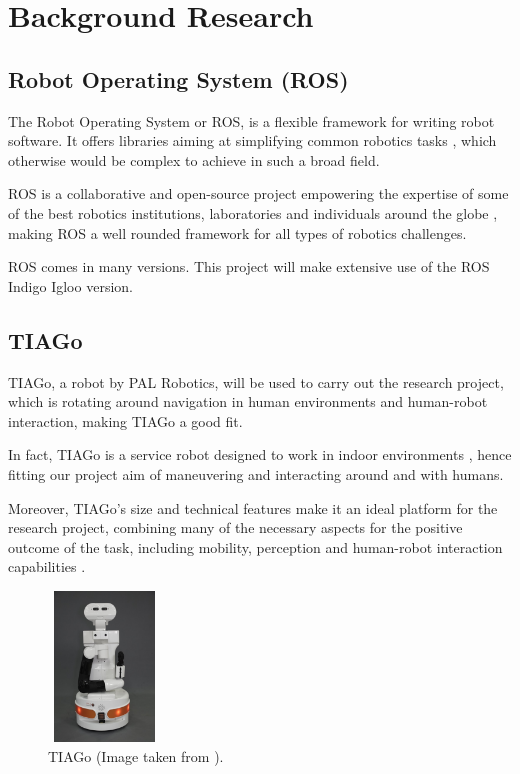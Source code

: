 \chapter{Background Research}
\label{chapter2}

\section{Robot Operating System (ROS)}

The Robot Operating System or ROS, is a flexible framework for writing robot software. It offers libraries aiming at simplifying common robotics tasks \cite{website:aboutROS}, which otherwise would be complex to achieve in such a broad field.

ROS is a collaborative and open-source project empowering the expertise of some of the best robotics institutions, laboratories and individuals around the globe \cite{website:aboutROS}, making ROS a well rounded framework for all types of robotics challenges. 

ROS comes in many versions. This project will make extensive use of the ROS Indigo Igloo version.

\section{TIAGo}

TIAGo, a robot by PAL Robotics, will be used to carry out the research project, which is rotating around navigation in human environments and human-robot interaction, making TIAGo a good fit.

In fact, TIAGo is a service robot designed to work in indoor environments \cite{website:TIAGo}, hence fitting our project aim of maneuvering and interacting around and with humans. 

Moreover, TIAGo's size and technical features make it an ideal platform for the research project, combining many of the necessary aspects for the positive outcome of the task, including mobility, perception and human-robot interaction capabilities \cite{website:TIAGo}.

\begin{figure}[!htbp]
\begin{center}
\includegraphics[width=3cm,height=4cm,keepaspectratio]{images/tiago.jpg}
\end{center}
\caption{TIAGo (Image taken from \cite{website:TIAGOWEBSITE}).}
\end{figure}

